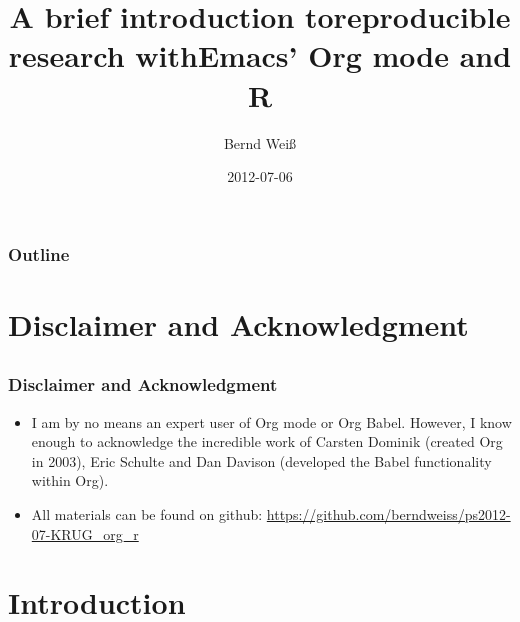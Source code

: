 \documentclass[bigger]{beamer}
\institute{\url{http://berndweiss.net} \\ \url{bernd.weiss@uni-koeln.de}}
\title{A brief introduction to\newline reproducible research with\newline Emacs' Org mode and R}
\author{Bernd Weiß}
\date{\footnotesize{2012-07-06}}
\begin{document}
\maketitle

\begin{frame}
\frametitle{Outline}
\setcounter{tocdepth}{3}
\tableofcontents
\end{frame}























\section{Disclaimer and Acknowledgment}
\label{sec-1}
\subsection{}
\begin{frame}
\frametitle{Disclaimer and Acknowledgment}
\label{sec-1-1-1}

\begin{itemize}
\item I am by no means an expert user of Org mode or Org Babel. However, I know
  enough to acknowledge the incredible work of Carsten Dominik (created Org in 2003), Eric Schulte and Dan Davison (developed the Babel functionality within Org).
\item All materials can be found on github: \href{https://github.com/berndweiss/ps2012-07-KRUG_org_r}{https://github.com/berndweiss/ps2012-07-KRUG\_org\_r}
\end{itemize}
\end{frame}
\section{Introduction}
\label{sec-2}
\end{document}
